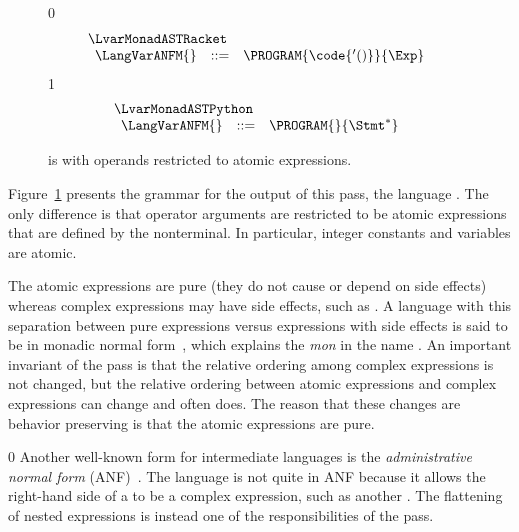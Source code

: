 \documentclass[7x10]{TimesAPriori_MIT}%
\def\racketEd{0}
\def\pythonEd{1}
\def\edition{1}
\newcommand{\pythonColor}[0]{}
\numberwithin{theorem}{chapter}
\numberwithin{definition}{chapter}
\numberwithin{equation}{chapter}
\begin{document}
\begin{figure}[tp]
\centering
\begin{tcolorbox}[colback=white]
{\if\edition\racketEd
\[
\begin{array}{l}
  \LvarMonadASTRacket \\
\begin{array}{rcl}
\LangVarANFM{}  &::=& \PROGRAM{\code{'()}}{\Exp}
\end{array}
\end{array}
\]
\fi}
{\if\edition\pythonEd\pythonColor
\[
\begin{array}{l}
  \LvarMonadASTPython \\
\begin{array}{rcl}
\LangVarANFM{}  &::=& \PROGRAM{}{\Stmt^{*}}
\end{array}
\end{array}
\]
\fi}  
\end{tcolorbox}

\caption{\LangVarANF{} is \LangVar{} with operands restricted to
  atomic expressions.}
\label{fig:Lvar-anf-syntax}
\end{figure}

Figure~\ref{fig:Lvar-anf-syntax} presents the grammar for the output
of this pass, the language \LangVarANF{}. The only difference is that
operator arguments are restricted to be atomic expressions that are
defined by the \Atm{} nonterminal. In particular, integer constants
and variables are atomic.

The atomic expressions are pure (they do not cause or depend on side
effects) whereas complex expressions may have side effects, such as
\READ{}.  A language with this separation between pure expressions
versus expressions with side effects is said to be in monadic normal
form~\citep{Moggi:1991in,Danvy:2003fk}, which explains the \textit{mon}
in the name \LangVarANF{}. An important invariant of the
 pass is that the relative ordering
among complex expressions is not changed, but the relative ordering
between atomic expressions and complex expressions can change and
often does. The reason that these changes are behavior preserving is
that the atomic expressions are pure.

{\if\edition\racketEd
  Another well-known form for intermediate languages is the
\emph{administrative normal form}
(ANF)~\citep{Danvy:1991fk,Flanagan:1993cg}.
 
%
The \LangVarANF{} language is not quite in ANF because it allows the
right-hand side of a  to be a complex expression, such as
another . The flattening of nested  expressions is
instead one of the responsibilities of the 
pass.
\fi}
\end{document}
